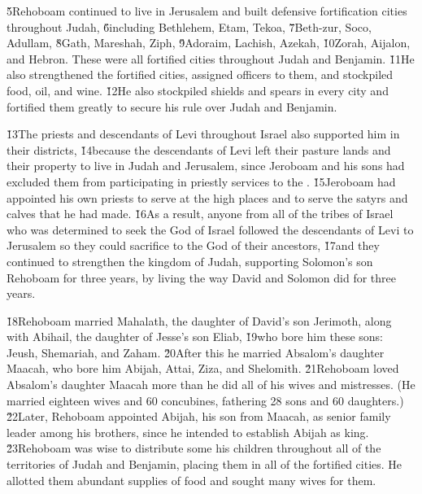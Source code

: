\v{5}Rehoboam continued to live in Jerusalem and built defensive fortification cities throughout Judah, \v{6}including Bethlehem, Etam, Tekoa, \v{7}Beth-zur, Soco, Adullam, \v{8}Gath, Mareshah, Ziph, \v{9}Adoraim, Lachish, Azekah, \v{10}Zorah, Aijalon, and Hebron. These were all fortified cities throughout Judah and Benjamin. \v{11}He also strengthened the fortified cities, assigned officers to them, and stockpiled food, oil, and wine. \v{12}He also stockpiled shields and spears in every city and fortified them greatly to secure his rule over Judah and Benjamin.

\v{13}The priests and descendants of Levi throughout Israel also supported him in their districts, \v{14}because the descendants of Levi left their pasture lands and their property to live in Judah and Jerusalem, since Jeroboam and his sons had excluded them from participating in priestly services to the . \v{15}Jeroboam had appointed his own priests to serve at the high places and to serve the satyrs and calves that he had made. \v{16}As a result, anyone from all of the tribes of Israel who was determined to seek the  God of Israel followed the descendants of Levi to Jerusalem so they could sacrifice to the  God of their ancestors, \v{17}and they continued to strengthen the kingdom of Judah, supporting Solomon's son Rehoboam for three years, by living the way David and Solomon did for three years.

\v{18}Rehoboam married Mahalath, the daughter of David's son Jerimoth, along with Abihail, the daughter of Jesse's son Eliab, \v{19}who bore him these sons: Jeush, Shemariah, and Zaham. \v{20}After this he married Absalom's daughter Maacah, who bore him Abijah, Attai, Ziza, and Shelomith. \v{21}Rehoboam loved Absalom's daughter Maacah more than he did all of his wives and mistresses. (He married eighteen wives and 60 concubines, fathering 28 sons and 60 daughters.) \v{22}Later, Rehoboam appointed Abijah, his son from Maacah, as senior family leader among his brothers, since he intended to establish Abijah as king. \v{23}Rehoboam was wise to distribute some his children throughout all of the territories of Judah and Benjamin, placing them in all of the fortified cities. He allotted them abundant supplies of food and sought many wives for them.

